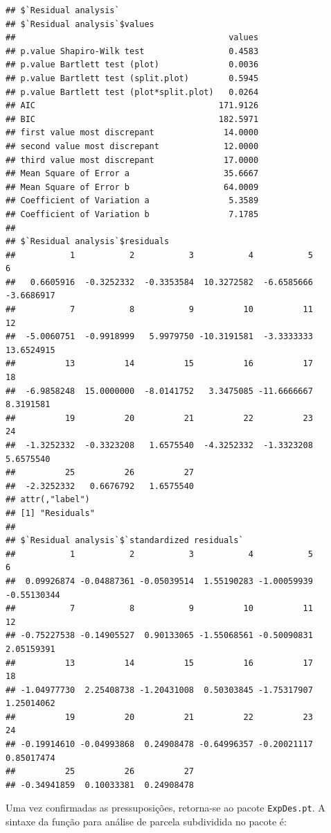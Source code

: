 \documentclass[
]{article}
\begin{document}
\begin{verbatim}
## $`Residual analysis`
## $`Residual analysis`$values
##                                           values
## p.value Shapiro-Wilk test                 0.4583
## p.value Bartlett test (plot)              0.0036
## p.value Bartlett test (split.plot)        0.5945
## p.value Bartlett test (plot*split.plot)   0.0264
## AIC                                     171.9126
## BIC                                     182.5971
## first value most discrepant              14.0000
## second value most discrepant             12.0000
## third value most discrepant              17.0000
## Mean Square of Error a                   35.6667
## Mean Square of Error b                   64.0009
## Coefficient of Variation a                5.3589
## Coefficient of Variation b                7.1785
## 
## $`Residual analysis`$residuals
##           1           2           3           4           5           6 
##   0.6605916  -0.3252332  -0.3353584  10.3272582  -6.6585666  -3.6686917 
##           7           8           9          10          11          12 
##  -5.0060751  -0.9918999   5.9979750 -10.3191581  -3.3333333  13.6524915 
##          13          14          15          16          17          18 
##  -6.9858248  15.0000000  -8.0141752   3.3475085 -11.6666667   8.3191581 
##          19          20          21          22          23          24 
##  -1.3252332  -0.3323208   1.6575540  -4.3252332  -1.3323208   5.6575540 
##          25          26          27 
##  -2.3252332   0.6676792   1.6575540 
## attr(,"label")
## [1] "Residuals"
## 
## $`Residual analysis`$`standardized residuals`
##           1           2           3           4           5           6 
##  0.09926874 -0.04887361 -0.05039514  1.55190283 -1.00059939 -0.55130344 
##           7           8           9          10          11          12 
## -0.75227538 -0.14905527  0.90133065 -1.55068561 -0.50090831  2.05159391 
##          13          14          15          16          17          18 
## -1.04977730  2.25408738 -1.20431008  0.50303845 -1.75317907  1.25014062 
##          19          20          21          22          23          24 
## -0.19914610 -0.04993868  0.24908478 -0.64996357 -0.20021117  0.85017474 
##          25          26          27 
## -0.34941859  0.10033381  0.24908478
\end{verbatim}

Uma vez confirmadas as pressuposições, retorna-se ao pacote \texttt{ExpDes.pt}. A sintaxe da função para análise de parcela subdividida no pacote é:
\end{document}
